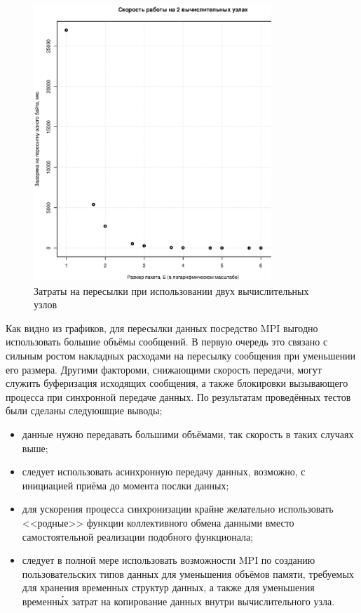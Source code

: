 \begin{figure}[htp]
\centering
\includegraphics[width=0.8\textwidth]{eps/mpi-2hosts.eps}
\caption{Затраты на пересылки при использовании двух вычислительных узлов}
\label{pic:mpi2hosts}
\end{figure}
Как видно из графиков, для пересылки данных посредство MPI выгодно использовать большие объёмы сообщений. В первую очередь это связано с сильным ростом накладных расходами на пересылку сообщения при уменьшении его размера. Другими фактороми, снижающими скорость передачи, могут служить буферизация исходящих сообщения, а также блокировки вызывающего процесса при синхронной передаче данных. По результатам проведённых тестов были сделаны следуюшщие выводы;
\begin{itemize}
	\item данные нужно передавать большими объёмами, так скорость в таких случаях выше;
	\item следует использовать асинхронную передачу данных, возможно, с инициацией приёма до момента послки данных;
	\item для ускорения процесса синхронизации крайне желательно использовать <<родные>> функции коллективного обмена данными вместо самостоятельной реализации подобного функционала;
	\item следует в полной мере использовать возможности MPI по созданию пользовательских типов данных для уменьшения объёмов памяти, требуемых для хранения временных структур данных, а также для уменьшения временн\'{ы}х затрат на копирование данных внутри вычислительного узла.
\end{itemize}

